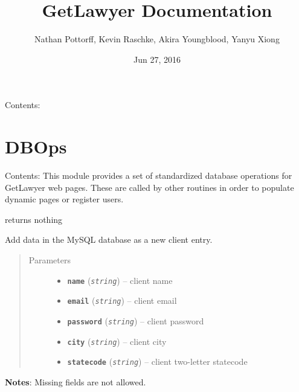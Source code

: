 \documentclass[letterpaper,10pt,english]{sphinxmanual}
\title{GetLawyer Documentation}
\date{Jun 27, 2016}
\author{Nathan Pottorff, Kevin Raschke, Akira Youngblood, Yanyu Xiong}
\begin{document}
\maketitle
\tableofcontents
{}\label{index::doc}


Contents:


\chapter{DBOps}
\label{DBOps::doc}\label{DBOps:dbops}\label{DBOps:welcome-to-getlawyer-s-documentation}
Contents:
\label{DBOps:module-DBOps}
This module provides a set of standardized database operations for GetLawyer web pages. These are called by other routines in order to populate dynamic pages or register users.

\begin{fulllineitems}
\label{DBOps:DBOps.addClient}
returns nothing

Add data in the MySQL database as a new client entry.
\begin{quote}\begin{description}
\item[{Parameters}] \leavevmode\begin{itemize}
\item {} 
\textbf{\texttt{name}} (\emph{\texttt{string}}) -- client name

\item {} 
\textbf{\texttt{email}} (\emph{\texttt{string}}) -- client email

\item {} 
\textbf{\texttt{password}} (\emph{\texttt{string}}) -- client password

\item {} 
\textbf{\texttt{city}} (\emph{\texttt{string}}) -- client city

\item {} 
\textbf{\texttt{statecode}} (\emph{\texttt{string}}) -- client two-letter statecode

\end{itemize}

\end{description}\end{quote}

\textbf{Notes}:
Missing fields are not allowed.

\end{fulllineitems}
\end{document}
